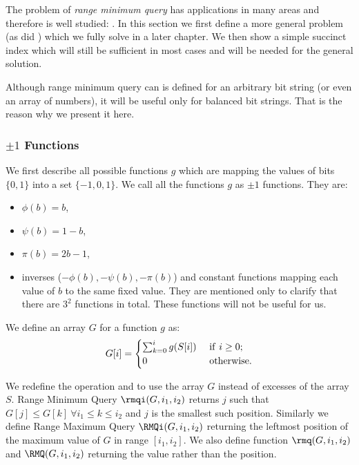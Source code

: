 The problem of \emph{range minimum query} has applications in many areas and therefore is well studied: \cite{bender2000lca, fischer2010optimal, durocher2013simple}.
In this section we first define a more general problem (as did \cite{sadakane2010fully}) which we fully solve in a later chapter.
We then show a simple succinct index which will still be sufficient in most cases and will be needed for the general solution.

Although range minimum query can is defined for an arbitrary bit string (or even an array of numbers), it will be useful only for balanced bit strings.
That is the reason why we present it here.

\subsubsection{$\pm 1$ Functions}\label{ss:rmq-def}

We first describe all possible functions $g$ which are mapping the values of bits $\{0, 1\}$ into a set $\{-1, 0, 1\}$.
We call all the functions $g$ as $\pm 1$ functions.
They are:
\begin{itemize}
	\item $\phi(b) = b$,
	\item $\psi(b) = 1 - b$,
	\item $\pi(b) = 2 b - 1$,
	\item inverses ($-\phi(b), -\psi(b), -\pi(b)$) and constant functions mapping each value of $b$ to the same fixed value.
	They are mentioned only to clarify that there are $3^2$ functions in total.
	These functions will not be useful for us.
\end{itemize}

We define an array $G$ for a function $g$ as:
$$ G[i] = \begin{cases}
	\sum_{k = 0}^i g(S[i]) & \ \textrm{\textnormal{if}}\  i \ge 0; \\
	0 & \ \textrm{\textnormal{otherwise}}.
\end{cases} $$

\bigbreak

We redefine the operation \rmqi{} and \RMQi{} to use the array $G$ instead of excesses of the array $S$.
Range Minimum Query $\rmqi(G, i_1, i_2)$ returns $j$ such that $G[j] \le G[k] \ \forall i_1 \le k \le i_2$ and $j$ is the smallest such position.
Similarly we define Range Maximum Query $\RMQi(G, i_1, i_2)$ returning the leftmost position of the maximum value of $G$ in range $[i_1, i_2]$.
We also define function $\rmq(G, i_1, i_2)$ and $\RMQ(G, i_1, i_2)$ returning the value rather than the position.

